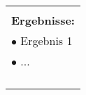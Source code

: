 \begin{table}[!h]
\begin{center}
\begin{tabular}{|p{35mm}||p{55mm}|p{50mm}||p{40mm}|}
   \multicolumn{4}{|p{150mm}|}{}\\
   \multicolumn{4}{|p{150mm}|}{\textbf{Ergebnisse:}}\\
   \multicolumn{4}{|p{150mm}|}{$\bullet$ Ergebnis 1}\\
   \multicolumn{4}{|p{150mm}|}{$\bullet$ ...}\\
	 \multicolumn{4}{|p{150mm}|}{}\\
   \multicolumn{4}{|p{150mm}|}{}\\
   \multicolumn{4}{|p{150mm}|}{}\\
   \multicolumn{4}{|p{150mm}|}{}\\
   \hline
  \end{tabular}
 \end{center}
\end{table}

\clearpage


